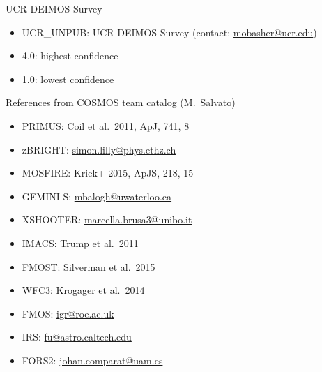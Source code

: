 \documentclass[12pt,onecolumn]{article}
\begin{document}
\noindent UCR DEIMOS Survey
\begin{itemize}
\item UCR\_UNPUB: UCR DEIMOS Survey (contact: \href{mailto:mobasher@ucr.edu}{mobasher@ucr.edu})
\item 4.0: highest confidence
\item 1.0: lowest confidence
\end{itemize}


\noindent References from COSMOS team catalog (M.~Salvato)
\begin{itemize}
\item PRIMUS: Coil et al.\ 2011, ApJ, 741, 8
\item zBRIGHT: \href{mailto:simon.lilly@phys.ethz.ch}{simon.lilly@phys.ethz.ch}
\item MOSFIRE: Kriek+ 2015, ApJS, 218, 15
\item GEMINI-S: \href{mailto:mbalogh@uwaterloo.ca}{mbalogh@uwaterloo.ca}
\item XSHOOTER: \href{mailto:marcella.brusa3@unibo.it}{marcella.brusa3@unibo.it}
\item IMACS: Trump et al.\ 2011
\item FMOST: Silverman et al.\ 2015
\item WFC3: Krogager et al.\ 2014
\item FMOS: \href{mailto:igr@roe.ac.uk}{igr@roe.ac.uk}
\item IRS: \href{mailto:fu@astro.caltech.edu}{fu@astro.caltech.edu}
\item FORS2: \href{mailto:johan.comparat@uam.es}{johan.comparat@uam.es}
\end{itemize}
\end{document}
